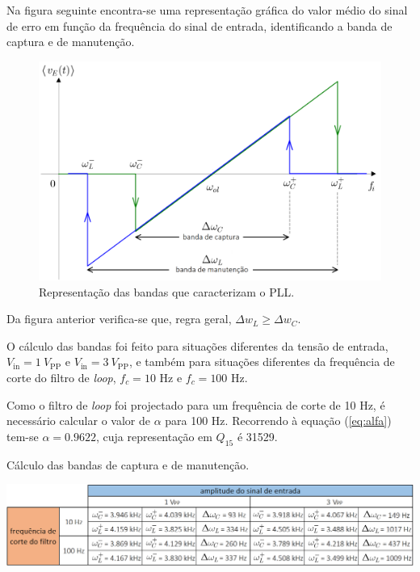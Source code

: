 \documentclass[11pt]{article}
\numberwithin{equation}{section}
\begin{document}
Na figura seguinte encontra-se uma representação gráfica do valor médio do sinal de erro em função da frequência do sinal de entrada, identificando a banda de captura e de manutenção.

\begin{figure}[H]
	\centering
	\includegraphics[keepaspectratio=true, scale=0.25]{teoricas/malhas}
	\caption{Representação das bandas que caracterizam o PLL.}
	\vspace{-0.8em}
\end{figure} 

Da figura anterior verifica-se que, regra geral, $\Delta w_L \geq \Delta w_C$.

O cálculo das bandas foi feito para situações diferentes da tensão de entrada, $V_{\text{in}} = 1~V_{\text{PP}}$ e $V_{\text{in}} = 3~V_{\text{PP}}$, e também para situações diferentes da frequência de corte do filtro de \textit{loop}, $f_{c} = 10$ Hz e $f_{c} = 100$ Hz.

Como o filtro de \textit{loop} foi projectado para um frequência de corte de 10 Hz, é necessário calcular o valor de $\alpha$ para 100 Hz. Recorrendo à equação (\ref{eq:alfa}) tem-se $\alpha = 0.9622$, cuja representação em $Q_{15}$ é 31529. 

\begin{table}[H]
	\centering
	\caption{Cálculo das bandas de captura e de manutenção.}
	\vspace{-1.5mm}
	\includegraphics[keepaspectratio=true, scale=0.35]{tabelas/bandas}
\end{table}
\end{document}
